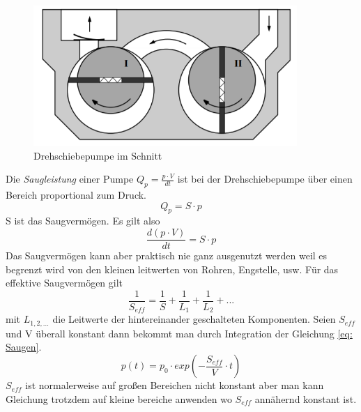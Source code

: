 \documentclass[12pt]{article}
\begin{document}
		\begin{figure}[h]
		\centering
		\includegraphics[width=10cm]{Drehschiebepumpe.png}
		\caption{Drehschiebepumpe im Schnitt}
		\label{fig: Drehschiebepumpe}
		\end{figure}
	Die \textit{Saugleistung} einer Pumpe $Q_p=\frac{p\cdot V}{dt}$ ist bei der Drehschiebepumpe über einen Bereich proportional zum Druck.
	\begin{equation}
		Q_p=S \cdot p
	\end{equation}
	S ist das Saugvermögen. Es gilt also
	\begin{equation}\label{eq: Saugen}
		\frac{d(p\cdot V)}{dt}=S \cdot p
	\end{equation}
	Das Saugvermögen kann aber praktisch nie ganz ausgenutzt werden weil es begrenzt wird von den kleinen leitwerten von Rohren, Engstelle, usw. Für das effektive Saugvermögen gilt
	\begin{equation}
		\frac{1}{S_{eff}}=\frac{1}{S}+\frac{1}{L_1}+\frac{1}{L_2}+...
	\end{equation}
	mit $L_{1,2,...}$ die Leitwerte der hintereinander geschalteten Komponenten.
	Seien $S_{eff}$ und V überall konstant dann bekommt man durch Integration der Gleichung \ref{eq: Saugen}.
	\begin{equation}\label{eq: exp sauen}
		p(t)=p_0 \cdot exp(-\frac{S_{eff}}{V}\cdot t)
	\end{equation}
	$S_{eff}$ ist normalerweise auf großen Bereichen nicht konstant aber man kann Gleichung trotzdem auf kleine bereiche anwenden wo $S_{eff}$ annähernd konstant ist.
\end{document}
